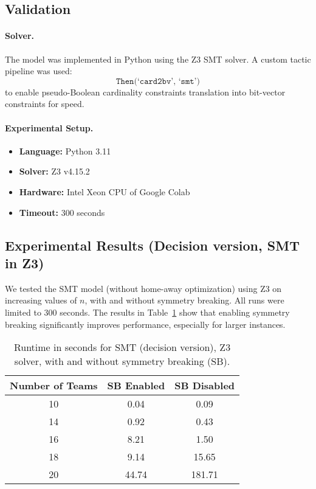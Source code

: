 \subsection{Validation}

\paragraph{Solver.}
The model was implemented in Python using the Z3 SMT solver. A custom tactic pipeline was used:
\[
\texttt{Then(`card2bv', `smt')}
\]
to enable pseudo-Boolean cardinality constraints  translation into bit-vector constraints for speed.

\paragraph{Experimental Setup.}
\begin{itemize}
    \item \textbf{Language:} Python 3.11
    \item \textbf{Solver:} Z3 v4.15.2
    \item \textbf{Hardware:} Intel Xeon CPU of Google Colab
    \item \textbf{Timeout:} 300 seconds
\end{itemize}

\subsection*{Experimental Results (Decision version, SMT in Z3)}

We tested the SMT model (without home-away optimization) using Z3 on increasing values of $n$, with and without symmetry breaking. All runs were limited to 300 seconds. The results in Table~\ref{tab:smt-results} show that enabling symmetry breaking significantly improves performance, especially for larger instances.

\begin{table}[h!]
\centering
\caption{Runtime in seconds for SMT (decision version), Z3 solver, with and without symmetry breaking (SB).}
\label{tab:smt-results}
\begin{tabular}{|c|c|c|}
\hline
\textbf{Number of Teams} & \textbf{SB Enabled} & \textbf{SB Disabled} \\
\hline
10 & 0.04 & 0.09 \\
14 & 0.92 & 0.43 \\
16 & 8.21 & 1.50 \\
18 & 9.14 & 15.65 \\
20 & 44.74 & 181.71 \\
\hline
\end{tabular}
\end{table}


